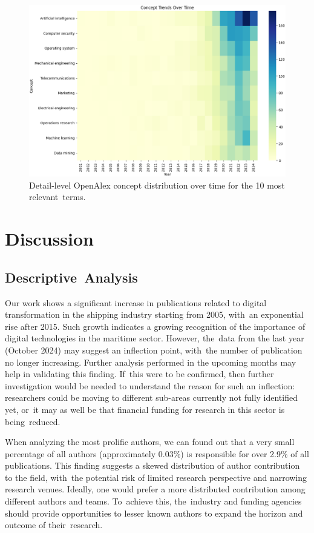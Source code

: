 \documentclass[jmse,review,accept,pdftex,moreauthors]{Definitions/mdpi}
\begin{document}
\vspace{-6pt}
\begin{figure}[H]
	\centering
	\includegraphics[width=\linewidth]{pics/main_concept_trend_lowerlevels.eps}
	\caption{Detail-level OpenAlex concept distribution over time for the 10 most relevant~terms.}\label{fig:fig14}
\end{figure}
\unskip


\section{Discussion}
\unskip

\subsection{Descriptive~Analysis}	
Our work shows a significant increase in publications related to digital transformation in the shipping industry starting from 2005, with~an exponential rise after 2015. Such growth indicates a growing recognition of the importance of digital technologies in the maritime sector. However, the~data from the last year (October 2024) may suggest an inflection point, with~the number of publication no longer increasing. Further analysis performed in the upcoming months may help in validating this finding. If~this were to be confirmed, then further investigation would be needed to understand the reason for such an inflection: researchers could be moving to different sub-areas currently not fully identified yet, or~it may as well be that financial funding for research in this sector is being~reduced.

\clearpage
When analyzing the most prolific authors, we can found out that a very small percentage of all authors (approximately 0.03\%) is responsible for over 2.9\% of all publications. This finding suggests a skewed distribution of author contribution to the field, with~the potential risk of limited research perspective and narrowing research venues. Ideally, one would prefer a more distributed contribution among different authors and teams. To~achieve this, the~industry and funding agencies should provide opportunities to lesser known authors to expand the horizon and outcome of their~research.
\end{document}
